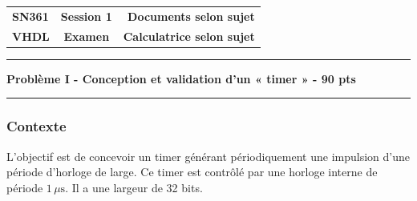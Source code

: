 \documentclass[11pt, a4paper]{article}
\begin{document}
\noindent
\begin{tabularx}{\textwidth}{@{}X c r@{}}
\textbf{SN361} & \textbf{Session 1} & \textbf{Documents selon sujet} \\
\textbf{VHDL} & \textbf{Examen} & \textbf{Calculatrice selon sujet} \\
\end{tabularx}
\vspace{0.2cm}
\hrule
\vspace{0.4cm}

\begin{center}
    \textbf{\Large Problème I - Conception et validation d'un « timer » - 90 pts}
\end{center}
\vspace{-0.2cm}
\hrule
\vspace{0.3cm}

\subsubsection*{Contexte}
\noindent L'objectif est de concevoir un timer générant périodiquement une impulsion d'une période d'horloge de large. Ce timer est contrôlé par une horloge interne de période $1\,\mu\text{s}$. Il a une largeur de 32 bits.
\end{document}
